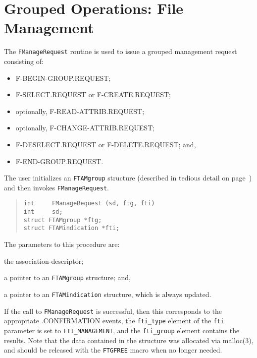 \section	{Grouped Operations: File Management}
The \verb"FManageRequest" routine is used to issue a grouped management
request consisting of:
\begin{itemize}
\item	{\sf F-BEGIN-GROUP.REQUEST\/};

\item	{\sf F-SELECT.REQUEST\/} or {\sf F-CREATE.REQUEST\/};

\item	optionally, {\sf F-READ-ATTRIB.REQUEST\/};

\item	optionally, {\sf F-CHANGE-ATTRIB.REQUEST\/};

\item	{\sf F-DESELECT.REQUEST\/} or {\sf F-DELETE.REQUEST\/};
and,

\item	{\sf F-END-GROUP.REQUEST}.
\end{itemize}
The user initializes an \verb"FTAMgroup" structure
(described in tedious detail on page~\pageref{FTAMgroup})
and then invokes \verb"FManageRequest".
\begin{quote}\small\begin{verbatim}
int     FManageRequest (sd, ftg, fti)
int     sd;
struct FTAMgroup *ftg;
struct FTAMindication *fti;
\end{verbatim}\end{quote}
The parameters to this procedure are:
\begin{describe}
\item[\verb"sd":] the association-descriptor;

\item[\verb"ftg":] a pointer to an \verb"FTAMgroup" structure;
and,

\item[\verb"fti":] a pointer to an \verb"FTAMindication" structure, which is
always updated.
\end{describe}
If the call to \verb"FManageRequest" is successful,
then this corresponds to the appropriate {\sf .CONFIRMATION\/} events,
the \verb"fti_type" element of the \verb"fti" parameter is set to
\verb"FTI_MANAGEMENT",
and the \verb"fti_group" element contains the results.
Note that the data contained in the structure was allocated via \man malloc(3),
and should be released with the \verb"FTGFREE" macro when no longer needed.

